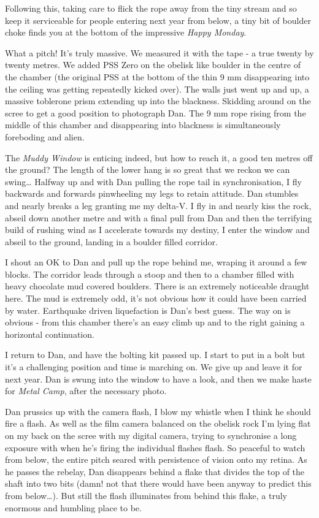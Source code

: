 Following this, taking care to flick the rope away from the tiny stream
and so keep it serviceable for people entering next year from below, a
tiny bit of boulder choke finds you at the bottom of the impressive
\emph{Happy Monday}.

What a pitch! It's truly massive. We measured it with the tape - a true
twenty by twenty metres. We added PSS Zero on the obelisk like boulder
in the centre of the chamber (the original PSS at the bottom of the thin
9 mm disappearing into the ceiling was getting repeatedly kicked over).
The walls just went up and up, a massive toblerone prism extending up
into the blackness. Skidding around on the scree to get a good position
to photograph Dan. The 9 mm rope rising from the middle of this chamber
and disappearing into blackness is simultaneously foreboding and alien.

The \emph{Muddy Window} is enticing indeed, but how to reach it, a good
ten metres off the ground? The length of the lower hang is so great that
we reckon we can swing\ldots{} Halfway up and with Dan pulling the rope
tail in synchronisation, I fly backwards and forwards pinwheeling my
legs to retain attitude. Dan stumbles and nearly breaks a leg granting
me my delta-V. I fly in and nearly kiss the rock, abseil down another
metre and with a final pull from Dan and then the terrifying build of
rushing wind as I accelerate towards my destiny, I enter the window and
abseil to the ground, landing in a boulder filled corridor.

I shout an OK to Dan and pull up the rope behind me, wraping it around a
few blocks. The corridor leads through a stoop and then to a chamber
filled with heavy chocolate mud covered boulders. There is an extremely
noticeable draught here. The mud is extremely odd, it's not obvious how
it could have been carried by water. Earthquake driven liquefaction is
Dan's best guess. The way on is obvious - from this chamber there's an
easy climb up and to the right gaining a horizontal continuation.

I return to Dan, and have the bolting kit passed up. I start to put in a
bolt but it's a challenging position and time is marching on. We give up
and leave it for next year. Dan is swung into the window to have a look,
and then we make haste for \emph{Metal Camp}, after the necessary photo.

Dan prussics up with the camera flash, I blow my whistle when I think he
should fire a flash. As well as the film camera balanced on the obelisk
rock I'm lying flat on my back on the scree with my digital camera,
trying to synchronise a long exposure with when he's firing the
individual flashes flash. So peaceful to watch from below, the entire
pitch seared with persistence of vision onto my retina. As he passes the
rebelay, Dan disappears behind a flake that divides the top of the shaft
into two bits (damn! not that there would have been anyway to predict
this from below\ldots{}). But still the flash illuminates from behind
this flake, a truly enormous and humbling place to be.

